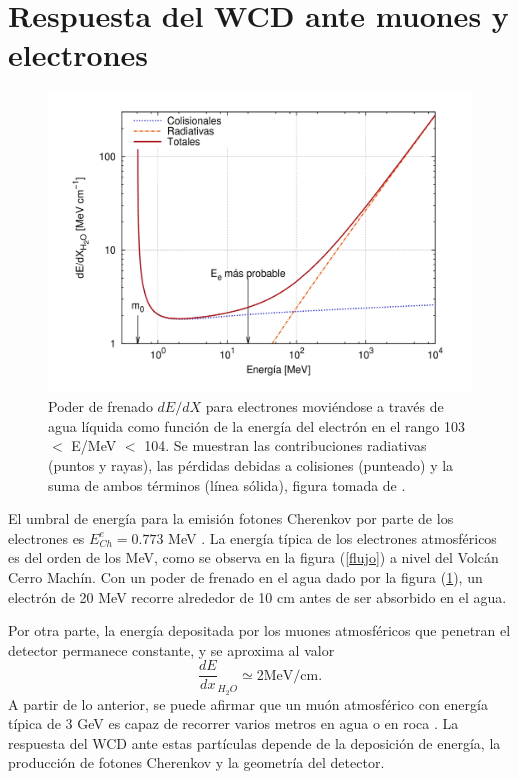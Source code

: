 \documentclass[12pt,oneside,openany,letter]{book}
\begin{document}
\section{Respuesta del WCD ante muones y electrones}
\begin{figure}[h!]
    \centering
        \includegraphics[scale=0.4]{images/stopping_e.png}
   \caption[Poder de frenado del electrón en agua líquida]{Poder de frenado $dE/dX$ para electrones moviéndose a través de agua líquida como función de la energía del electrón en el rango 103 $<$ E/MeV $<$ 104. Se muestran las contribuciones radiativas (puntos y rayas), las pérdidas debidas a colisiones (punteado) y la suma de ambos términos (línea sólida), figura tomada de \cite{Asorey-phd2012}.}\label{stopping_e}
\end{figure}
El umbral de energ\'ia para la emisión fotones Cherenkov por parte de los electrones es $E^e_{Ch}=0.773$ MeV \cite{Asorey-phd2012}. La energía típica de los electrones atmosféricos es del orden de los MeV, como se observa en la figura (\ref{flujo}) a nivel del Volc\'an Cerro Mach\'in. Con un poder de frenado en el agua dado por la figura (\ref{stopping_e}), un electrón de 20 MeV recorre alrededor de 10 cm antes de ser absorbido en el agua.

Por otra parte, la energía depositada por los muones atmosféricos que penetran el detector permanece constante, y se aproxima al valor 
\begin{equation}
\frac{dE}{dx}_{H_2O} \simeq 2 \text{MeV/cm}.
\end{equation}
A partir de lo anterior, se puede afirmar que un muón atmosférico con energía típica de 3 GeV es capaz de recorrer varios metros en agua o en roca \cite{Asorey-phd2012}. La respuesta del WCD ante estas partículas depende de la deposición de energía, la producción de fotones Cherenkov y la geometría del detector. 
\end{document}
